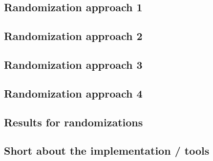 \documentclass[a4paper,10pt]{article}
\theoremstyle{plain}
\theoremstyle{definition}
\begin{document}
\subsection{Randomization approach 1}

\subsection{Randomization approach 2}

\subsection{Randomization approach 3}

\subsection{Randomization approach 4}

\subsection{Results for randomizations}

\subsection{Short about the implementation / tools}
\end{document}
